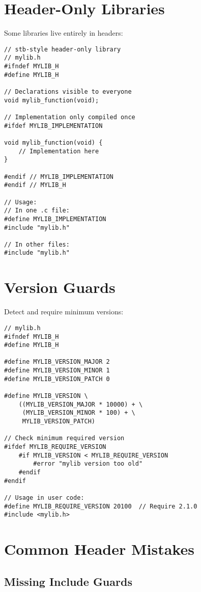 \section{Header-Only Libraries}

Some libraries live entirely in headers:

\begin{lstlisting}
// stb-style header-only library
// mylib.h
#ifndef MYLIB_H
#define MYLIB_H

// Declarations visible to everyone
void mylib_function(void);

// Implementation only compiled once
#ifdef MYLIB_IMPLEMENTATION

void mylib_function(void) {
    // Implementation here
}

#endif // MYLIB_IMPLEMENTATION
#endif // MYLIB_H

// Usage:
// In one .c file:
#define MYLIB_IMPLEMENTATION
#include "mylib.h"

// In other files:
#include "mylib.h"
\end{lstlisting}

\section{Version Guards}

Detect and require minimum versions:

\begin{lstlisting}
// mylib.h
#ifndef MYLIB_H
#define MYLIB_H

#define MYLIB_VERSION_MAJOR 2
#define MYLIB_VERSION_MINOR 1
#define MYLIB_VERSION_PATCH 0

#define MYLIB_VERSION \
    ((MYLIB_VERSION_MAJOR * 10000) + \
     (MYLIB_VERSION_MINOR * 100) + \
     MYLIB_VERSION_PATCH)

// Check minimum required version
#ifdef MYLIB_REQUIRE_VERSION
    #if MYLIB_VERSION < MYLIB_REQUIRE_VERSION
        #error "mylib version too old"
    #endif
#endif

// Usage in user code:
#define MYLIB_REQUIRE_VERSION 20100  // Require 2.1.0
#include <mylib.h>
\end{lstlisting}

\section{Common Header Mistakes}

\subsection{Missing Include Guards}

